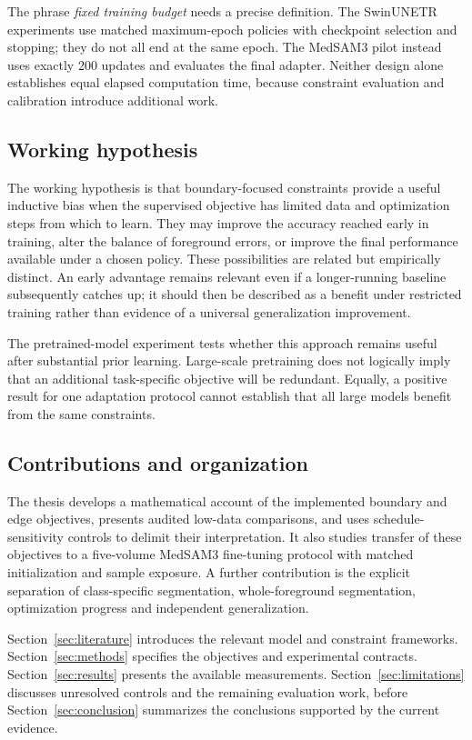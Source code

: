 The phrase \emph{fixed training budget} needs a precise definition. The SwinUNETR experiments use matched maximum-epoch policies with checkpoint selection and stopping; they do not all end at the same epoch. The MedSAM3 pilot instead uses exactly 200 updates and evaluates the final adapter. Neither design alone establishes equal elapsed computation time, because constraint evaluation and calibration introduce additional work.

\subsection{Working hypothesis}
The working hypothesis is that boundary-focused constraints provide a useful inductive bias when the supervised objective has limited data and optimization steps from which to learn. They may improve the accuracy reached early in training, alter the balance of foreground errors, or improve the final performance available under a chosen policy. These possibilities are related but empirically distinct. An early advantage remains relevant even if a longer-running baseline subsequently catches up; it should then be described as a benefit under restricted training rather than evidence of a universal generalization improvement.

The pretrained-model experiment tests whether this approach remains useful after substantial prior learning. Large-scale pretraining does not logically imply that an additional task-specific objective will be redundant. Equally, a positive result for one adaptation protocol cannot establish that all large models benefit from the same constraints.

\subsection{Contributions and organization}
The thesis develops a mathematical account of the implemented boundary and edge objectives, presents audited low-data comparisons, and uses schedule-sensitivity controls to delimit their interpretation. It also studies transfer of these objectives to a five-volume MedSAM3 fine-tuning protocol with matched initialization and sample exposure. A further contribution is the explicit separation of class-specific segmentation, whole-foreground segmentation, optimization progress and independent generalization.

Section~\ref{sec:literature} introduces the relevant model and constraint frameworks. Section~\ref{sec:methods} specifies the objectives and experimental contracts. Section~\ref{sec:results} presents the available measurements. Section~\ref{sec:limitations} discusses unresolved controls and the remaining evaluation work, before Section~\ref{sec:conclusion} summarizes the conclusions supported by the current evidence.
